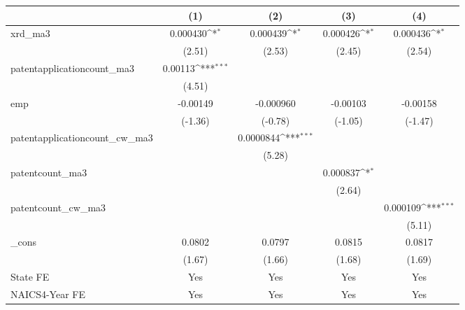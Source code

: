 {
\def\sym#1{\ifmmode^{#1}\else\(^{#1}\)\fi}
\begin{tabular}{l*{4}{c}}
\hline\hline
            &\multicolumn{1}{c}{(1)}         &\multicolumn{1}{c}{(2)}         &\multicolumn{1}{c}{(3)}         &\multicolumn{1}{c}{(4)}         \\
\hline
xrd\_ma3     &    0.000430\sym{*}  &    0.000439\sym{*}  &    0.000426\sym{*}  &    0.000436\sym{*}  \\
            &      (2.51)         &      (2.53)         &      (2.45)         &      (2.54)         \\
[1em]
patentapplicationcount\_ma3&     0.00113\sym{***}&                     &                     &                     \\
            &      (4.51)         &                     &                     &                     \\
[1em]
emp         &    -0.00149         &   -0.000960         &    -0.00103         &    -0.00158         \\
            &     (-1.36)         &     (-0.78)         &     (-1.05)         &     (-1.47)         \\
[1em]
patentapplicationcount\_cw\_ma3&                     &   0.0000844\sym{***}&                     &                     \\
            &                     &      (5.28)         &                     &                     \\
[1em]
patentcount\_ma3&                     &                     &    0.000837\sym{*}  &                     \\
            &                     &                     &      (2.64)         &                     \\
[1em]
patentcount\_cw\_ma3&                     &                     &                     &    0.000109\sym{***}\\
            &                     &                     &                     &      (5.11)         \\
[1em]
\_cons      &      0.0802         &      0.0797         &      0.0815         &      0.0817         \\
            &      (1.67)         &      (1.66)         &      (1.68)         &      (1.69)         \\
[1em]
State FE    &         Yes         &         Yes         &         Yes         &         Yes         \\
[1em]
NAICS4-Year FE&         Yes         &         Yes         &         Yes         &         Yes         \\

\end{tabular}}
